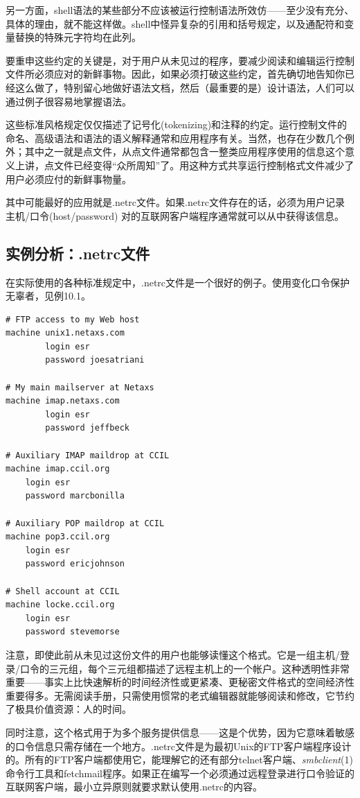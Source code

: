 \documentclass[12pt,oneside]{book}
\begin{document}
另一方面，shell语法的某些部分不应该被运行控制语法所效仿——至少没有充分、具体的理由，就不能这样做。shell中怪异复杂的引用和括号规定，以及通配符和变量替换的特殊元字符均在此列。

要重申这些约定的关键是，对于用户从未见过的程序，要减少阅读和编辑运行控制文件所必须应对的新鲜事物。因此，如果必须打破这些约定，首先确切地告知你已经这么做了，特别留心地做好语法文档，然后（最重要的是）设计语法，人们可以通过例子很容易地掌握语法。

这些标准风格规定仅仅描述了记号化(tokenizing)和注释的约定。运行控制文件的命名、高级语法和语法的语义解释通常和应用程序有关。当然，也存在少数几个例外；其中之一就是点文件，从点文件通常都包含一整类应用程序使用的信息这个意义上讲，点文件已经变得“众所周知”了。用这种方式共享运行控制格式文件减少了用户必须应付的新鲜事物量。

其中可能最好的应用就是.netrc文件。如果.netrc文件存在的话，必须为用户记录主机/口令(host/password) 对的互联网客户端程序通常就可以从中获得该信息。


\subsection{实例分析：.netrc文件}
在实际使用的各种标准规定中，.netrc文件是一个很好的例子。使用变化口令保护无辜者，见例10.1。
\begin{Verbatim}[label=例10.1 .netrc例子]
# FTP access to my Web host
machine unix1.netaxs.com
        login esr
        password joesatriani

# My main mailserver at Netaxs
machine imap.netaxs.com
        login esr
        password jeffbeck

# Auxiliary IMAP maildrop at CCIL
machine imap.ccil.org
    login esr
    password marcbonilla

# Auxiliary POP maildrop at CCIL
machine pop3.ccil.org
    login esr
    password ericjohnson

# Shell account at CCIL
machine locke.ccil.org
    login esr
    password stevemorse
\end{Verbatim}

注意，即使此前从未见过这份文件的用户也能够读懂这个格式。它是一组主机/登录/口令的三元组，每个三元组都描述了远程主机上的一个帐户。这种透明性非常重要——事实上比快速解析的时间经济性或更紧凑、更秘密文件格式的空间经济性重要得多。无需阅读手册，只需使用惯常的老式编辑器就能够阅读和修改，它节约了极具价值资源：人的时间。

同时注意，这个格式用于为多个服务提供信息——这是个优势，因为它意味着敏感的口令信息只需存储在一个地方。.netrc文件是为最初Unix的FTP客户端程序设计的。所有的FTP客户端都使用它，能理解它的还有部分telnet客户端、\textit{smbclient}(1)命令行工具和fetchmail程序。如果正在编写一个必须通过远程登录进行口令验证的互联网客户端，最小立异原则就要求默认使用.netrc的内容。
\end{document}
